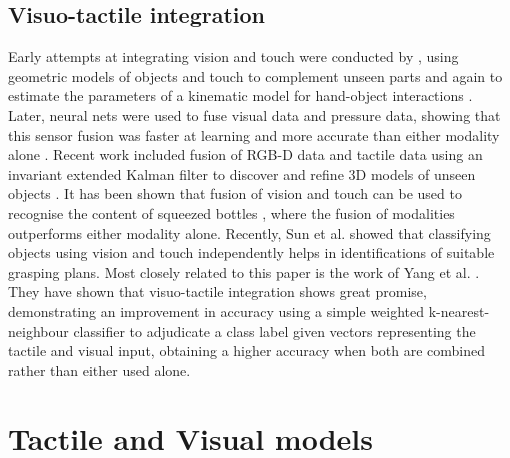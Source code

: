 \documentclass[9pt,technote]{IEEEtran}  %
\begin{document}
\subsection{Visuo-tactile integration}
Early attempts at integrating vision and touch were conducted by \cite{Allen1988}, using geometric models of objects and touch to complement unseen parts and again to estimate the parameters of a kinematic model for hand-object interactions \cite{Allen1999}.
Later, neural nets were used to fuse visual data and pressure data, showing that this sensor fusion was faster at learning and more accurate than either modality alone \cite{Kim2004}.
Recent work included fusion of RGB-D data and tactile data using an invariant extended Kalman filter to discover and refine 3D models of unseen objects \cite{Ilonen2013}.
It has been shown that fusion of vision and touch can be used to recognise the content of squeezed bottles \cite{Guler2014}, where the fusion of modalities outperforms either modality alone.
Recently, Sun et al. \cite{Sun2016} showed that classifying objects using vision and touch independently helps in identifications of suitable grasping plans. 
Most closely related to this paper is the work of Yang et al. \cite{Yang2015}. They have shown that visuo-tactile integration shows great promise, demonstrating an improvement in accuracy using a simple weighted k-nearest-neighbour classifier to adjudicate a class label given vectors representing the tactile and visual input, obtaining a higher accuracy when both are combined rather than either used alone.

\section{Tactile and Visual models}
\end{document}
